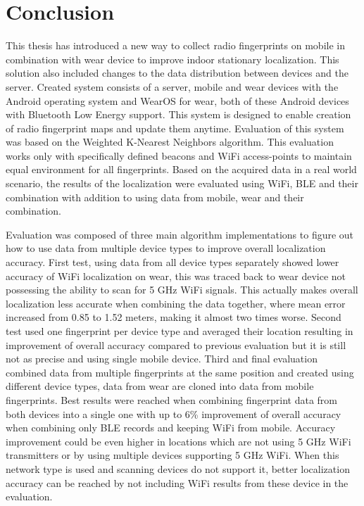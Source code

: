 \chapter{Conclusion}\label{sec:Conclusion}
This thesis has introduced a new way to collect radio fingerprints on mobile in combination with wear device to improve indoor stationary localization. This solution also included changes to the data distribution between devices and the server. Created system consists of a server, mobile and wear devices with the Android operating system and WearOS for wear, both of these Android devices with Bluetooth Low Energy support. This system is designed to enable creation of radio fingerprint maps and update them anytime. Evaluation of this system was based on the Weighted K-Nearest Neighbors algorithm. This evaluation works only with specifically defined beacons and WiFi access-points to maintain equal environment for all fingerprints. Based on the acquired data in a real world scenario, the results of the localization were evaluated using WiFi, BLE and their combination with addition to using data from mobile, wear and their combination.

Evaluation was composed of three main algorithm implementations to figure out how to use data from multiple device types to improve overall localization accuracy. First test, using data from all device types separately showed lower accuracy of WiFi localization on wear, this was traced back to wear device not possessing the ability to scan for 5 GHz WiFi signals. This actually makes overall localization less accurate when combining the data together, where mean error increased from 0.85 to 1.52 meters, making it almost two times worse. Second test used one fingerprint per device type and averaged their location resulting in improvement of overall accuracy compared to previous evaluation but it is still not as precise and using single mobile device. Third and final evaluation combined data from multiple fingerprints at the same position and created using different device types, data from wear are cloned into data from mobile fingerprints. Best results were reached when combining fingerprint data from both devices into a single one with up to 6\% improvement of overall accuracy when combining only BLE records and keeping WiFi from mobile. Accuracy improvement could be even higher in locations which are not using 5 GHz WiFi transmitters or by using multiple devices supporting 5 GHz WiFi. When this network type is used and scanning devices do not support it, better localization accuracy can be reached by not including WiFi results from these device in the evaluation.

